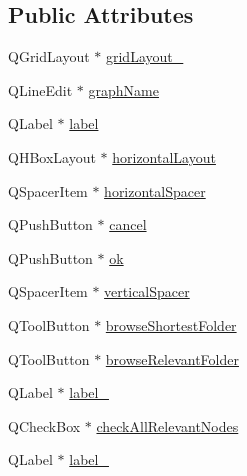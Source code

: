 \subsection*{Public Attributes}
\begin{DoxyCompactItemize}
\item 
Q\+Grid\+Layout $\ast$ \mbox{\hyperlink{class_ui___create_shortest_path_dialog_a0d6b977145ab84e68fdb72bd1dee7999}{grid\+Layout\+\_}}
\item 
Q\+Line\+Edit $\ast$ \mbox{\hyperlink{class_ui___create_shortest_path_dialog_a7725395f127ab977309634e6115805fe}{graph\+Name}}
\item 
Q\+Label $\ast$ \mbox{\hyperlink{class_ui___create_shortest_path_dialog_a9f8bb331162b9ead362b4c7ce7b738d3}{label}}
\item 
Q\+H\+Box\+Layout $\ast$ \mbox{\hyperlink{class_ui___create_shortest_path_dialog_a858e8b31d82883509584a6e98b4f3fce}{horizontal\+Layout}}
\item 
Q\+Spacer\+Item $\ast$ \mbox{\hyperlink{class_ui___create_shortest_path_dialog_ad93a8807aa9b01a7e1174006868c097b}{horizontal\+Spacer}}
\item 
Q\+Push\+Button $\ast$ \mbox{\hyperlink{class_ui___create_shortest_path_dialog_ae1eab97219ce7cfe7dc29c151c174bc2}{cancel}}
\item 
Q\+Push\+Button $\ast$ \mbox{\hyperlink{class_ui___create_shortest_path_dialog_a174f1d1f3e4edfeb6ee57cd64bf5fda1}{ok}}
\item 
Q\+Spacer\+Item $\ast$ \mbox{\hyperlink{class_ui___create_shortest_path_dialog_a65d48afb0d832a1ddc306dd1787b32e2}{vertical\+Spacer}}
\item 
Q\+Tool\+Button $\ast$ \mbox{\hyperlink{class_ui___create_shortest_path_dialog_a4fe7aeb8dcf73b96ce3bd3e30f42412b}{browse\+Shortest\+Folder}}
\item 
Q\+Tool\+Button $\ast$ \mbox{\hyperlink{class_ui___create_shortest_path_dialog_ab8f1a7b774d6645bb29d4325f58167f5}{browse\+Relevant\+Folder}}
\item 
Q\+Label $\ast$ \mbox{\hyperlink{class_ui___create_shortest_path_dialog_a3a3adc0d02a276e26f923d3846d30ece}{label\+\_}}
\item 
Q\+Check\+Box $\ast$ \mbox{\hyperlink{class_ui___create_shortest_path_dialog_a7d9820d15e0871df851b11329486d690}{check\+All\+Relevant\+Nodes}}
\item 
Q\+Label $\ast$ \mbox{\hyperlink{class_ui___create_shortest_path_dialog_ae201f04a096af1169f61439d7eaf8eeb}{label\+\_}}
\item 

\end{DoxyCompactItemize}
